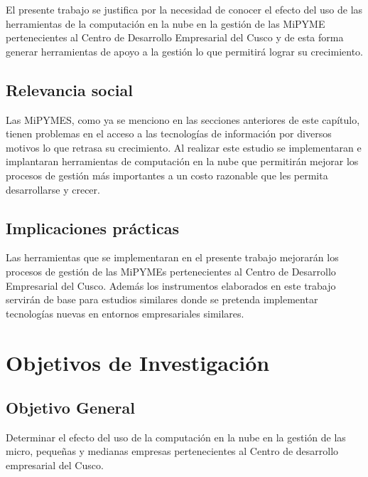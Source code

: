 El presente trabajo se justifica por la necesidad de conocer el efecto del uso
de las herramientas de la computación en la nube en la gestión de las MiPYME
pertenecientes al Centro de Desarrollo Empresarial del Cusco y de esta forma
generar herramientas de apoyo a la gestión lo que permitirá lograr su crecimiento.


\subsection{Relevancia social}
Las MiPYMES, como ya se menciono en las secciones anteriores de este capítulo,
tienen problemas en el acceso a las tecnologías de información por diversos motivos
lo que retrasa su crecimiento. Al realizar este estudio se implementaran e implantaran
herramientas de computación en la nube que permitirán mejorar los procesos de gestión
más importantes a un costo razonable que les permita desarrollarse y crecer.

\subsection{Implicaciones prácticas}
Las herramientas que se implementaran en el presente trabajo mejorarán los procesos
de gestión de las MiPYMEs pertenecientes al Centro de Desarrollo Empresarial del Cusco.
Además los instrumentos elaborados en este trabajo servirán de base para estudios
similares donde se pretenda implementar tecnologías nuevas en entornos empresariales
similares.


\section{Objetivos de Investigación}
\subsection{Objetivo General}
Determinar el efecto del uso de la computación en la nube en la gestión de
las micro, pequeñas y medianas empresas pertenecientes al Centro de desarrollo
empresarial del Cusco.
